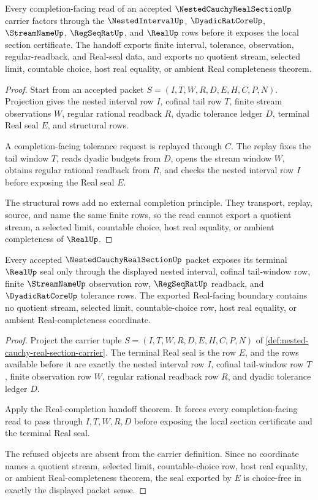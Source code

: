 \begin{theorem}
\label{thm:nested-cauchy-real-section-real-completion-handoff}
Every completion-facing read of an accepted $\NestedCauchyRealSectionUp$ carrier factors through the $\NestedIntervalUp$, $\DyadicRatCoreUp$, $\StreamNameUp$, $\RegSeqRatUp$, and $\RealUp$ rows before it exposes the local section certificate. The handoff exports finite interval, tolerance, observation, regular-readback, and Real-seal data, and exports no quotient stream, selected limit, countable choice, host real equality, or ambient Real completeness theorem.
\end{theorem}
\begin{proof}
Start from an accepted packet $S=(I,T,W,R,D,E,H,C,P,N)$. Projection gives the nested interval row $I$, cofinal tail row $T$, finite stream observations $W$, regular rational readback $R$, dyadic tolerance ledger $D$, terminal Real seal $E$, and structural rows.

A completion-facing tolerance request is replayed through $C$. The replay fixes the tail window $T$, reads dyadic budgets from $D$, opens the stream window $W$, obtains regular rational readback from $R$, and checks the nested interval row $I$ before exposing the Real seal $E$.

The structural rows add no external completion principle. They transport, replay, source, and name the same finite rows, so the read cannot export a quotient stream, a selected limit, countable choice, host real equality, or ambient completeness of $\RealUp$.
\end{proof}

\begin{theorem}
\label{thm:real-regular-cauchy-seal-choice-free}
Every accepted $\NestedCauchyRealSectionUp$ packet exposes its terminal $\RealUp$ seal only through the displayed nested interval, cofinal tail-window row, finite $\StreamNameUp$ observation row, $\RegSeqRatUp$ readback, and $\DyadicRatCoreUp$ tolerance rows. The exported Real-facing boundary contains no quotient stream, selected limit, countable-choice row, host real equality, or ambient Real-completeness coordinate.
\end{theorem}
\begin{proof}
Project the carrier tuple $S=(I,T,W,R,D,E,H,C,P,N)$ of \autoref{def:nested-cauchy-real-section-carrier}. The terminal Real seal is the row $E$, and the rows available before it are exactly the nested interval row $I$, cofinal tail-window row $T$, finite observation row $W$, regular rational readback row $R$, and dyadic tolerance ledger $D$.

Apply the Real-completion handoff theorem. It forces every completion-facing read to pass through $I,T,W,R,D$ before exposing the local section certificate and the terminal Real seal.

The refused objects are absent from the carrier definition. Since no coordinate names a quotient stream, selected limit, countable-choice row, host real equality, or ambient Real-completeness theorem, the seal exported by $E$ is choice-free in exactly the displayed packet sense.
\end{proof}

